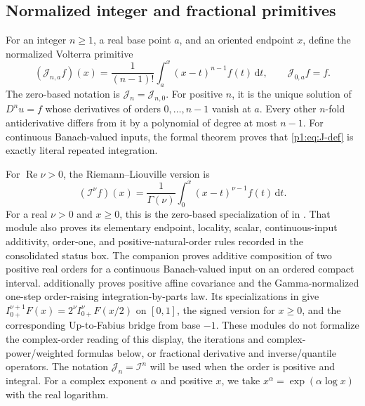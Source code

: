 \documentclass[11pt,oneside]{article}
\theoremstyle{definition}
\theoremstyle{remark}
\newcommand{\dd}{\,\mathrm d}
\newcommand{\Jn}{\mathcal J}
\newcommand{\RL}{\mathcal I}
\newcommand{\1}{\mathbf 1}
\DeclareMathOperator{\Rea}{Re}
\begin{document}
\subsection{Normalized integer and fractional primitives}
For an integer \(n\geq1\), a real base point \(a\), and an oriented endpoint
\(x\), define the normalized Volterra primitive
\begin{equation}
 (\Jn_{n,a}f)(x)=\frac1{(n-1)!}\int_a^x(x-t)^{n-1}f(t)\dd t,
 \qquad \Jn_{0,a}f=f.                                         \label{p1:eq:J-def}
\end{equation}
The zero-based notation is \(\Jn_n=\Jn_{n,0}\).  For positive \(n\), it is
the unique solution of \(D^n u=f\) whose derivatives of orders
\(0,\dots,n-1\) vanish at \(a\).  Every other \(n\)-fold antiderivative differs
from it by a polynomial of degree at most \(n-1\).  For continuous
Banach-valued inputs, the formal theorem
 proves that
\eqref{p1:eq:J-def} is exactly literal repeated integration.

For \(\Rea\nu>0\), the Riemann--Liouville version is
\begin{equation}
 (\RL^\nu f)(x)=\frac1{\Gamma(\nu)}
 \int_0^x(x-t)^{\nu-1}f(t)\dd t.                               \label{p1:eq:RL-def}
\end{equation}
For a real \(\nu>0\) and \(x\ge0\), this is the zero-based specialization of
 in .  That module also
proves its elementary endpoint, locality, scalar, continuous-input additivity, order-one,
and positive-natural-order rules recorded in the consolidated status box.  The companion
 proves additive composition of two
positive real orders for a continuous Banach-valued input on an ordered compact interval.
 additionally proves positive affine
covariance and the Gamma-normalized one-step order-raising integration-by-parts law.
Its specializations in  give
\(
 I_{0+}^{\nu+1}F(x)=2^\nu I_{0+}^{\nu}F(x/2)
\)
on \([0,1]\), the signed version for $x\ge0$, and the corresponding Up-to-Fabius bridge
from base $-1$.  These modules do not formalize the complex-order reading of this display,
the iterations and complex-power/weighted formulas below, or fractional derivative and
inverse/quantile operators.
The notation \(\Jn_n=\RL^n\) will be used when the order is positive and
integral.
For a complex exponent \(\alpha\) and positive \(x\), we take
\(x^\alpha=\exp(\alpha\log x)\) with the real logarithm.
\end{document}
